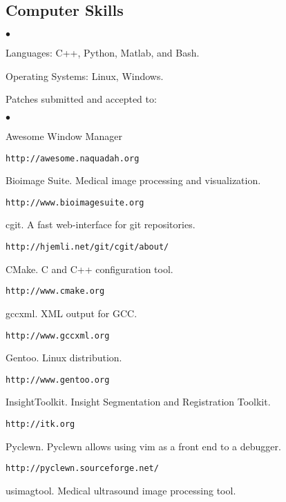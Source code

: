 \documentclass[margin,line]{res}
\newenvironment{list2}{
  \begin{list}{$\bullet$}{%
      \setlength{\itemsep}{0in}
      \setlength{\parsep}{0in} \setlength{\parskip}{0in}
      \setlength{\topsep}{0in} \setlength{\partopsep}{0in} 
      \setlength{\leftmargin}{0.2in}}}{\end{list}}
\begin{document}
\begin{resume}
% 
\section{\sc Computer Skills} 
\begin{list2}
\item Languages:  C++, Python, Matlab, and Bash.
\item Operating Systems:  Linux, Windows.\\ 
\end{list2}
\vspace*{-.15in}  

Patches submitted and accepted to:
\begin{list2}
\item Awesome Window Manager
  \begin{verbatim}http://awesome.naquadah.org\end{verbatim}
\item Bioimage Suite.  Medical image processing and visualization.
  \begin{verbatim}http://www.bioimagesuite.org\end{verbatim}
\item cgit. A fast web-interface for git repositories. \begin{verbatim}http://hjemli.net/git/cgit/about/\end{verbatim}
\item CMake.  C and C++ configuration tool. \begin{verbatim}http://www.cmake.org\end{verbatim}
\item gccxml.  XML output for GCC.
  \begin{verbatim}http://www.gccxml.org\end{verbatim}
\item Gentoo.  Linux distribution.
  \begin{verbatim}http://www.gentoo.org\end{verbatim}
\item InsightToolkit.  Insight Segmentation and Registration Toolkit.
  \begin{verbatim}http://itk.org\end{verbatim}
\item Pyclewn.  Pyclewn allows using vim as a front end to a debugger.
  \begin{verbatim}http://pyclewn.sourceforge.net/\end{verbatim}
\item usimagtool.  Medical ultrasound image processing tool.

\end{list2}
\end{resume}
\end{document}
